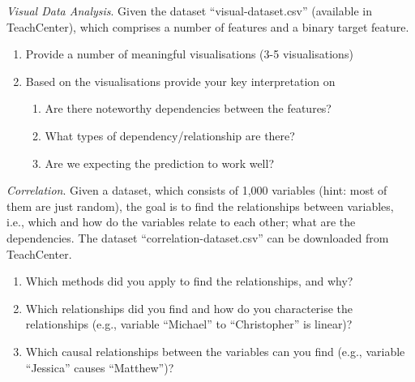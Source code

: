 \documentclass[a4paper,10pt]{article}\setlength{\textheight}{10in}\setlength{\textwidth}{6.5in}\setlength{\topmargin}{-0.125in}\setlength{\oddsidemargin}{-.2in}\setlength{\evensidemargin}{-.2in}\setlength{\headsep}{0.2in}\setlength{\footskip}{0pt}\usepackage{amsmath}\usepackage{fancyhdr}\usepackage{enumitem}\usepackage{hyperref}\usepackage{xcolor}\usepackage{graphicx}\pagestyle{fancy}
\begin{document}
\begin{enumerate}[topsep=0mm, partopsep=0mm, leftmargin=*]

{\color{blue}
\item\textit{Visual Data Analysis}. Given the dataset ``visual-dataset.csv'' (available in TeachCenter), which comprises a number of features and a binary target feature.
\begin{enumerate}
	\item Provide a number of meaningful visualisations (3-5 visualisations)
	\item Based on the visualisations provide your key interpretation on
	\begin{enumerate}
		\item Are there noteworthy dependencies between the features?
		\item What types of dependency/relationship are there?
		\item Are we expecting the prediction to work well?
	\end{enumerate}
\end{enumerate}
}


{\color{blue}
\newpage\item\textit{Correlation}. Given a dataset, which consists of 1,000 variables (hint: most of them are just random), the goal is to find the relationships between variables, i.e., which and how do the variables relate to each other; what are the dependencies.
The dataset ``correlation-dataset.csv'' can be downloaded from TeachCenter.
\begin{enumerate}
	\item Which methods did you apply to find the relationships, and why?
	\item Which relationships did you find and how do you characterise the relationships (e.g., variable ``Michael'' to ``Christopher'' is linear)?
	\item Which causal relationships between the variables can you find (e.g., variable ``Jessica'' causes ``Matthew'')?
\end{enumerate}
}





\end{enumerate}
\end{document}
